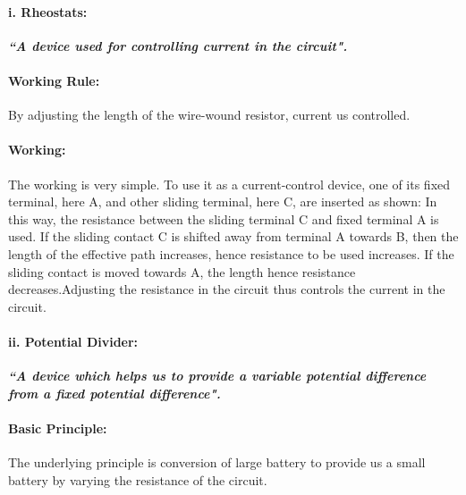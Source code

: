 \paragraph{i. Rheostats:}
\textit{\textbf{``A device used for controlling current in the circuit".}}
\paragraph{Working Rule:}
By adjusting the length of the wire-wound resistor, current us controlled.
\paragraph{Working:}
The working is very simple. To use it as a current-control device, one of its fixed terminal, here A, and other sliding terminal, here C, are inserted as shown:
In this way, the resistance between the sliding terminal C and fixed terminal A is used. If the sliding contact C is shifted away from terminal A towards B, then the length of the effective path increases, hence resistance to be used increases. If the sliding contact is moved towards A, the length hence resistance decreases.Adjusting the resistance in the circuit thus controls the current in the circuit.
\paragraph{ii. Potential Divider:}
\textit{\textbf{``A device which helps us to provide a variable potential difference  from a fixed potential difference".}}
\paragraph{Basic Principle:}
The underlying principle is conversion of large battery to provide us a small battery by varying the resistance of the circuit.
